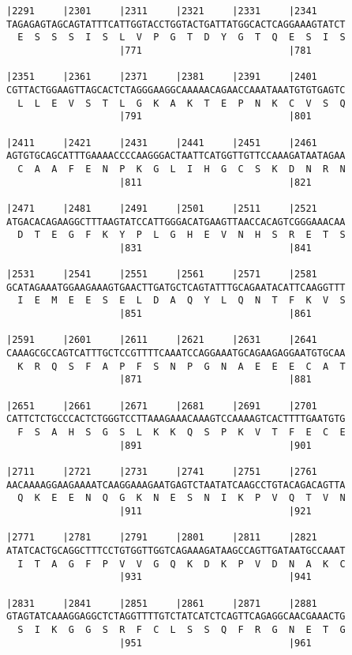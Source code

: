 \documentclass{article}
\begin{document}
\begin{Verbatim}
|2291     |2301     |2311     |2321     |2331     |2341     
TAGAGAGTAGCAGTATTTCATTGGTACCTGGTACTGATTATGGCACTCAGGAAAGTATCT
  E  S  S  S  I  S  L  V  P  G  T  D  Y  G  T  Q  E  S  I  S
                    |771                          |781      
  
|2351     |2361     |2371     |2381     |2391     |2401     
CGTTACTGGAAGTTAGCACTCTAGGGAAGGCAAAAACAGAACCAAATAAATGTGTGAGTC
  L  L  E  V  S  T  L  G  K  A  K  T  E  P  N  K  C  V  S  Q
                    |791                          |801      
  
|2411     |2421     |2431     |2441     |2451     |2461     
AGTGTGCAGCATTTGAAAACCCCAAGGGACTAATTCATGGTTGTTCCAAAGATAATAGAA
  C  A  A  F  E  N  P  K  G  L  I  H  G  C  S  K  D  N  R  N
                    |811                          |821      
  
|2471     |2481     |2491     |2501     |2511     |2521     
ATGACACAGAAGGCTTTAAGTATCCATTGGGACATGAAGTTAACCACAGTCGGGAAACAA
  D  T  E  G  F  K  Y  P  L  G  H  E  V  N  H  S  R  E  T  S
                    |831                          |841      
  
|2531     |2541     |2551     |2561     |2571     |2581     
GCATAGAAATGGAAGAAAGTGAACTTGATGCTCAGTATTTGCAGAATACATTCAAGGTTT
  I  E  M  E  E  S  E  L  D  A  Q  Y  L  Q  N  T  F  K  V  S
                    |851                          |861      
  
|2591     |2601     |2611     |2621     |2631     |2641     
CAAAGCGCCAGTCATTTGCTCCGTTTTCAAATCCAGGAAATGCAGAAGAGGAATGTGCAA
  K  R  Q  S  F  A  P  F  S  N  P  G  N  A  E  E  E  C  A  T
                    |871                          |881      
  
|2651     |2661     |2671     |2681     |2691     |2701     
CATTCTCTGCCCACTCTGGGTCCTTAAAGAAACAAAGTCCAAAAGTCACTTTTGAATGTG
  F  S  A  H  S  G  S  L  K  K  Q  S  P  K  V  T  F  E  C  E
                    |891                          |901      
  
|2711     |2721     |2731     |2741     |2751     |2761     
AACAAAAGGAAGAAAATCAAGGAAAGAATGAGTCTAATATCAAGCCTGTACAGACAGTTA
  Q  K  E  E  N  Q  G  K  N  E  S  N  I  K  P  V  Q  T  V  N
                    |911                          |921      
  
|2771     |2781     |2791     |2801     |2811     |2821     
ATATCACTGCAGGCTTTCCTGTGGTTGGTCAGAAAGATAAGCCAGTTGATAATGCCAAAT
  I  T  A  G  F  P  V  V  G  Q  K  D  K  P  V  D  N  A  K  C
                    |931                          |941      
  
|2831     |2841     |2851     |2861     |2871     |2881     
GTAGTATCAAAGGAGGCTCTAGGTTTTGTCTATCATCTCAGTTCAGAGGCAACGAAACTG
  S  I  K  G  G  S  R  F  C  L  S  S  Q  F  R  G  N  E  T  G
                    |951                          |961      
  

\end{Verbatim}
\end{document}
